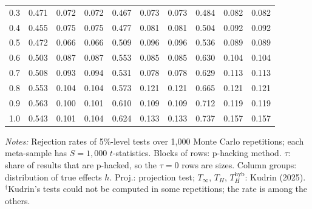 \begin{table}[htbp]
\begin{tabular}{lccccccccc}
0.3 & 0.471 & 0.072 & 0.072 & 0.467 & 0.073 & 0.073 & 0.484 & 0.082 & 0.082 \\
0.4 & 0.455 & 0.075 & 0.075 & 0.477 & 0.081 & 0.081 & 0.504 & 0.092 & 0.092 \\
0.5 & 0.472 & 0.066 & 0.066 & 0.509 & 0.096 & 0.096 & 0.536 & 0.089 & 0.089 \\
0.6 & 0.503 & 0.087 & 0.087 & 0.553 & 0.085 & 0.085 & 0.630 & 0.104 & 0.104 \\
0.7 & 0.508 & 0.093 & 0.094 & 0.531 & 0.078 & 0.078 & 0.629 & 0.113 & 0.113 \\
0.8 & 0.553 & 0.104 & 0.104 & 0.573 & 0.121 & 0.121 & 0.665 & 0.121 & 0.121 \\
0.9 & 0.563 & 0.100 & 0.101 & 0.610 & 0.109 & 0.109 & 0.712 & 0.119 & 0.119 \\
1.0 & 0.543 & 0.101 & 0.104 & 0.624 & 0.133 & 0.133 & 0.737 & 0.157 & 0.157 \\
\bottomrule
\end{tabular}
\par\smallskip
\begin{minipage}{\linewidth}\footnotesize\textit{Notes:} Rejection rates of 5\%-level tests over 1,000 Monte Carlo repetitions; each meta-sample has $S = 1{,}000$ $t$-statistics. Blocks of rows: p-hacking method. $\tau$: share of results that are p-hacked, so the $\tau = 0$ rows are sizes. Column groups: distribution of true effects $h$. Proj.: projection test; $T_\infty$, $T_H$, $T_H^{\mathrm{hyb}}$: Kudrin (2025). $^\dagger$Kudrin's tests could not be computed in some repetitions; the rate is among the others.\end{minipage}
\end{table}
